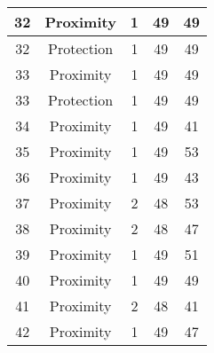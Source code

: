 \documentclass[results.tex]{subfiles}
\begin{document}
\begin{center}
\begin{tabular}{| c || c | c | c | c |}
            \hline
            32                      & Proximity                    & 1                      & 49                      & 49                   \\
            \hline
            32                      & Protection                   & 1                      & 49                      & 49                   \\
            \hline
            33                      & Proximity                    & 1                      & 49                      & 49                   \\
            \hline
            33                      & Protection                   & 1                      & 49                      & 49                   \\
            \hline
            34                      & Proximity                    & 1                      & 49                      & 41                   \\
            \hline
            35                      & Proximity                    & 1                      & 49                      & 53                   \\
            \hline
            36                      & Proximity                    & 1                      & 49                      & 43                   \\
            \hline
            37                      & Proximity                    & 2                      & 48                      & 53                   \\
            \hline
            38                      & Proximity                    & 2                      & 48                      & 47                   \\
            \hline
            39                      & Proximity                    & 1                      & 49                      & 51                   \\
            \hline
            40                      & Proximity                    & 1                      & 49                      & 49                   \\
            \hline
            41                      & Proximity                    & 2                      & 48                      & 41                   \\
            \hline
            42                      & Proximity                    & 1                      & 49                      & 47                   \\

\end{tabular}
\end{center}
\end{document}
